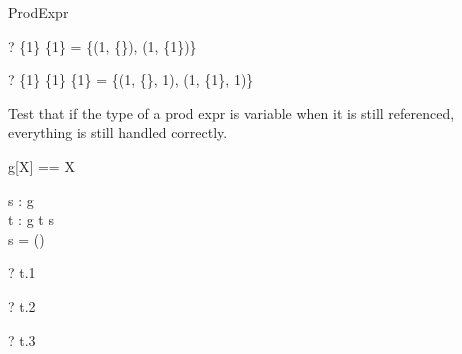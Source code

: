 \begin{zsection}
  \SECTION ProdExpr
\end{zsection}

\begin{zed}
  \vdash? \{1\} \cross \power \{1\} = \{(1, \{\}), (1, \{1\})\}
\end{zed}

\begin{zed}
  \vdash? \{1\} \cross \power \{1\} \cross \{1\} =
      \{(1, \{\}, 1), (1, \{1\}, 1)\}
\end{zed}

Test that if the type of a prod expr is variable when it is still 
referenced, everything is still handled correctly.
\begin{zed}
  g[X] == X
\end{zed}

\begin{axdef}
  s : g\\
  t : g
\where
  t \in s\\
  s = (\nat \cross \nat \cross \power \nat)
\end{axdef}

\begin{zed} \vdash? t.1 \in \nat \end{zed}
\begin{zed} \vdash? t.2 \in \nat \end{zed}
\begin{zed} \vdash? t.3 \in \power \nat \end{zed}
